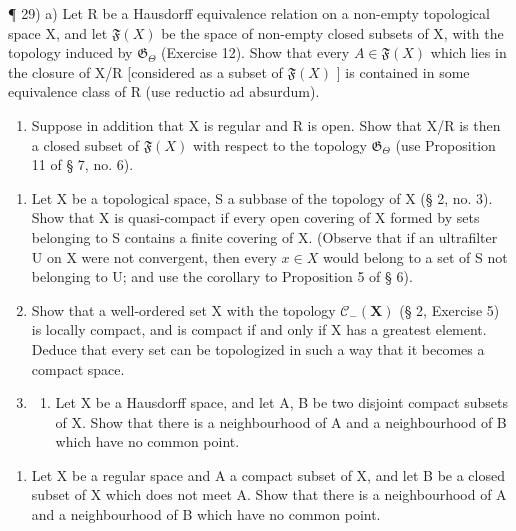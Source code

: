 ¶ 29) a) Let R be a Hausdorff equivalence relation on a non-empty topological space X, and let \(\mathfrak{F}(X)\) be the space of non-empty closed subsets of X, with the topology induced by \(\mathfrak{G}_{\Theta}\) (Exercise 12). Show that every \(A \in \mathfrak{F}(X)\) which lies in the closure of X/R {[}considered as a subset of \(\mathfrak{F}(X)\) {]} is contained in some equivalence class of R (use reductio ad absurdum).

\begin{enumerate}
\def\labelenumi{\alph{enumi})}
\setcounter{enumi}{1}
\tightlist
\item
  Suppose in addition that X is regular and R is open. Show that X/R is then a closed subset of \(\mathfrak{F}(X)\) with respect to the topology \(\mathfrak{G}_{\Theta}\) (use Proposition 11 of § 7, no. 6).
\end{enumerate}

\BourbakiExerciseGroup

\begin{enumerate}
\def\labelenumi{\arabic{enumi})}
\item
  Let X be a topological space, S a subbase of the topology of X (§ 2, no. 3). Show that X is quasi-compact if every open covering of X formed by sets belonging to S contains a finite covering of X. (Observe that if an ultrafilter U on X were not convergent, then every \(x \in X\) would belong to a set of S not belonging to U; and use the corollary to Proposition 5 of § 6).
\item
  Show that a well-ordered set X with the topology \(\mathcal{C}_{-}(\mathbf{X})\) (§ 2, Exercise 5) is locally compact, and is compact if and only if X has a greatest element. Deduce that every set can be topologized in such a way that it becomes a compact space.
\item
  \begin{enumerate}
  \def\labelenumii{\alph{enumii})}
  \tightlist
  \item
    Let X be a Hausdorff space, and let A, B be two disjoint compact subsets of X. Show that there is a neighbourhood of A and a neighbourhood of B which have no common point.
  \end{enumerate}
\end{enumerate}

\begin{enumerate}
\def\labelenumi{\alph{enumi})}
\setcounter{enumi}{1}
\tightlist
\item
  Let X be a regular space and A a compact subset of X, and let B be a closed subset of X which does not meet A. Show that there is a neighbourhood of A and a neighbourhood of B which have no common point.
\end{enumerate}

